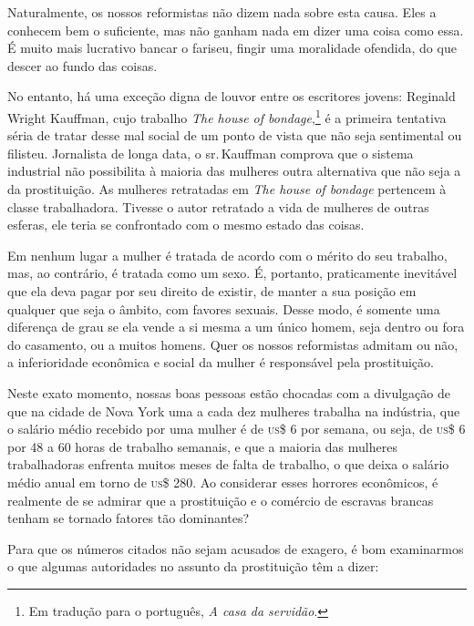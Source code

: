 Naturalmente, os nossos reformistas não dizem nada sobre esta causa.
Eles a conhecem bem o suficiente, mas não ganham nada em dizer uma coisa
como essa. É muito mais lucrativo bancar o fariseu, fingir uma
moralidade ofendida, do que descer ao fundo das coisas.

No entanto, há uma exceção digna de louvor entre os escritores jovens:
Reginald Wright Kauffman, cujo trabalho \textit{The house of bondage},\footnote{Em tradução para o português, \textit{A casa da servidão}.} é a primeira tentativa séria de tratar
desse mal social de um ponto de vista que não seja sentimental ou
filisteu. Jornalista de longa data, o sr.\,Kauffman comprova que o
sistema industrial não possibilita à maioria das mulheres outra
alternativa que não seja a da prostituição. As mulheres retratadas em
\textit{The house of bondage} pertencem à classe trabalhadora. Tivesse o
autor retratado a vida de mulheres de outras esferas, ele teria se
confrontado com o mesmo estado das coisas.

Em nenhum lugar a mulher é tratada de acordo com o mérito do seu
trabalho, mas, ao contrário, é tratada como um sexo. É, portanto,
praticamente inevitável que ela deva pagar por seu direito de existir,
de manter a sua posição em qualquer que seja o âmbito, com favores
sexuais. Desse modo, é somente uma diferença de grau se ela vende a si
mesma a um único homem, seja dentro ou fora do casamento, ou a muitos
homens. Quer os nossos reformistas admitam ou não, a inferioridade
econômica e social da mulher é responsável pela prostituição.

Neste exato momento, nossas boas pessoas estão chocadas com a divulgação
de que na cidade de Nova York uma a cada dez mulheres trabalha na
indústria, que o salário médio recebido por uma mulher é de \textsc{us}\$ 6 por
semana, ou seja, de \textsc{us}\$ 6 por 48 a 60 horas de trabalho semanais, e que a
maioria das mulheres trabalhadoras enfrenta muitos meses de falta de
trabalho, o que deixa o salário médio anual em torno de \textsc{us}\$ 280. Ao
considerar esses horrores econômicos, é realmente de se admirar que a
prostituição e o comércio de escravas brancas tenham se tornado fatores
tão dominantes?

Para que os números citados não sejam acusados de exagero, é bom
examinarmos o que algumas autoridades no assunto da prostituição têm a
dizer:

